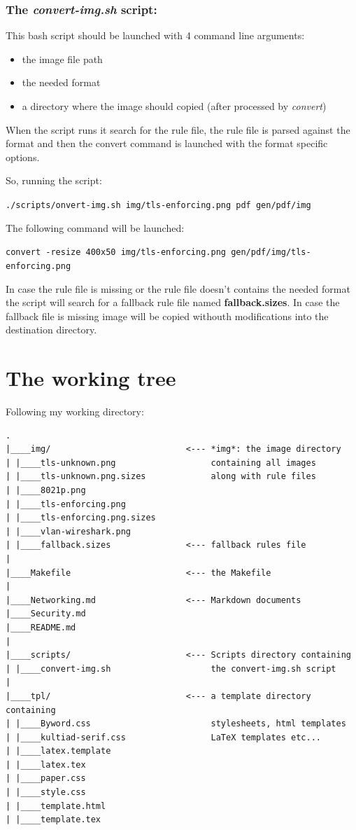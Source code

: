 \documentclass[	DIV=calc,%
							paper=a4,%
							fontsize=10pt]{scrartcl}	 					%
\begin{document}
\subsubsection{The \emph{convert-img.sh}
script:}\label{the-convert-img.sh-script}

This bash script should be launched with 4 command line arguments:

\begin{itemize}
\itemsep1pt\parskip0pt
\item
  the image file path
\item
  the needed format
\item
  a directory where the image should copied (after processed by
  \emph{convert})
\end{itemize}

When the script runs it search for the rule file, the rule file is
parsed against the format and then the convert command is launched with
the format specific options.

So, running the script:

\texttt{./scripts/onvert-img.sh img/tls-enforcing.png pdf gen/pdf/img}

The following command will be launched:

\texttt{convert -resize 400x50 img/tls-enforcing.png gen/pdf/img/tls-enforcing.png}

In case the rule file is missing or the rule file doesn't contains the
needed format the script will search for a fallback rule file named
\textbf{fallback.sizes}. In case the fallback file is missing image will
be copied withouth modifications into the destination directory.

\section{The working tree}\label{the-working-tree}

Following my working directory:

\begin{verbatim}
.
|____img/                           <--- *img*: the image directory          
| |____tls-unknown.png                   containing all images
| |____tls-unknown.png.sizes             along with rule files
| |____8021p.png
| |____tls-enforcing.png
| |____tls-enforcing.png.sizes
| |____vlan-wireshark.png
| |____fallback.sizes               <--- fallback rules file
|
|____Makefile                       <--- the Makefile
|
|____Networking.md                  <--- Markdown documents
|____Security.md
|____README.md
|
|____scripts/                       <--- Scripts directory containing
| |____convert-img.sh                    the convert-img.sh script 
|
|____tpl/                           <--- a template directory containing
| |____Byword.css                        stylesheets, html templates
| |____kultiad-serif.css                 LaTeX templates etc...
| |____latex.template
| |____latex.tex
| |____paper.css
| |____style.css
| |____template.html
| |____template.tex
\end{verbatim}
\end{document}
